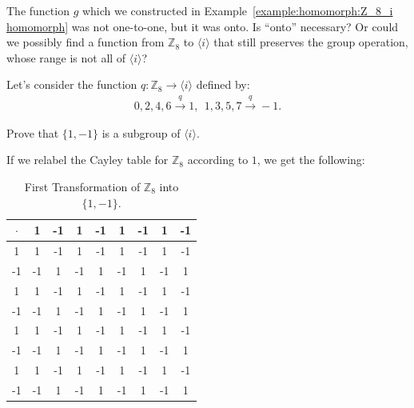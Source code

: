 \begin{example}\label{example:homomorph:Z_8_isub_homomorph}
The function $g$ which we constructed in Example~\ref{example:homomorph:Z_8_i homomorph} was not one-to-one, but it was onto. Is ``onto'' necessary? Or could we possibly find a function from ${\mathbb Z}_8$ to $\langle i \rangle$ that still preserves the group operation, whose range is not all of $\langle i \rangle$?  


Let's consider the function $q: {\mathbb Z}_8 \longrightarrow \langle i \rangle$  defined by: 
\begin{align*}
    0,2,4,6\overset{q}{\longrightarrow} 1 ,~~     1,3,5,7 \overset{q}{\longrightarrow} -1.
\end{align*}

\begin{exercise}\label{exercise:homomorph:1,-1_subgroup}
Prove that $\{1,-1\}$ is a subgroup of $\langle i \rangle$.
\end{exercise}

If we relabel the Cayley table for ${\mathbb Z}_8$ according to $1$, we get the following:

\begin{table}[H]
\caption{\label{1,-1_Z8_transfom1}First Transformation of ${\mathbb Z}_8$ into $\{1,-1\}$.}{\small
\begin{center}
\begin{tabular}{c|cccccccc}
$\cdot$ & 1 &-1 & 1 & -1 & 1 & -1 & 1 & -1 \\
\hline
1         & 1 &-1 & 1 & -1 & 1 & -1 & 1 & -1 \\
-1      &-1 & 1 & -1 & 1 & -1 & 1 & -1 & 1  \\
1       & 1 &-1 & 1 & -1 & 1 & -1 & 1 & -1 \\
-1       &-1 & 1 & -1 & 1 & -1 & 1 & -1 & 1  \\
1        & 1 &-1 & 1 & -1 & 1 & -1 & 1 & -1 \\
-1        &-1 & 1 & -1 & 1 & -1 & 1 & -1 & 1  \\
1      & 1 &-1 & 1 & -1 & 1 & -1 & 1 & -1 \\
-1      &-1 & 1 & -1 & 1 & -1 & 1 & -1 & 1  \\
\end{tabular}
\end{center}
}
\end{table}


\end{example}
